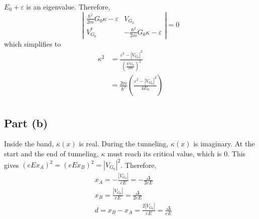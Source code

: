 \documentclass{article}
\begin{document}
$E_0+\varepsilon$ is an eigenvalue. Therefore,
\begin{equation*}
\left|\begin{array}{cc}\frac{\hbar^2}{2m}G_0\kappa-\varepsilon&V_{G_0}\\V_{G_0}^*&-\frac{\hbar^2}{2m}G_0\kappa-\varepsilon\end{array}\right|=0
\end{equation*}
which simplifies to
\begin{align*}
\kappa^2&=\frac{\varepsilon^2-|V_{G_0}|^2}{\left(\frac{\hbar^2G_0}{2m}\right)^2}\\
&=\frac{2m}{\hbar^2}\left(\frac{\varepsilon^2-|V_{G_0}|^2}{4E_0}\right)\\
\end{align*}

\subsection{Part (b)}
%
Inside the band, $\kappa(x)$ is real. During the tunneling, $\kappa(x)$ is imaginary. At the start and the end of tunneling, $\kappa$ must reach its critical value, which is 0. This gives $(eEx_A)^2=(eEx_B)^2=|V_{G_0}|^2$. Therefore,
\begin{align*}
&x_A=-\frac{|V_{G_0}|}{eE}=-\frac{\Delta}{2eE}\\
&x_B=\frac{|V_{G_0}|}{eE}=\frac{\Delta}{2eE}\\
&d=x_B-x_A=\frac{2|V_{G_0}|}{eE}=\frac{\Delta}{eE}
\end{align*}
\end{document}
